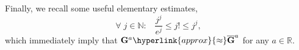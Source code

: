 \documentclass[11pt,a4paper]{article}
\theoremstyle{plain}
\newtheorem{lemma}[proposition]{Lemma}
\theoremstyle{definition}
\newcommand{\RR}{\mathbb{R}}
\newcommand{\NN}{\mathbb{N}}
\newcommand{\M}{\mathbf{M}}
\newcommand{\G}{\mathbf{G}}
\begin{document}
Finally{,} we recall some useful elementary estimates,
\begin{equation}\label{Stirling}
	\forall\;j\in\NN:\;\;\;\frac{j^j}{e^j}\le j!\le j^j,
\end{equation}
which immediately imply that  %
%
 $\G^a\hyperlink{approx}{\approx}\overline{\G}^a$ for any $a\in\RR$.



\end{document}
